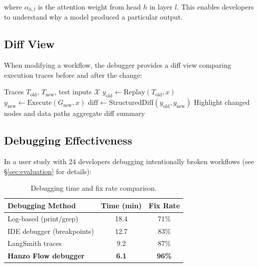 where $\alpha_{h,l}$ is the attention weight from head $h$ in layer $l$. This enables developers to understand why a model produced a particular output.

\subsection{Diff View}

When modifying a workflow, the debugger provides a diff view comparing execution traces before and after the change:

\begin{algorithm}[H]
\caption{Execution Diff Analysis}
\label{alg:diff}
\begin{algorithmic}[1]
\Require Traces $T_{\text{old}}$, $T_{\text{new}}$, test inputs $\mathcal{X}$
    \State $y_{\text{old}} \gets \text{Replay}(T_{\text{old}}, x)$
    \State $y_{\text{new}} \gets \text{Execute}(G_{\text{new}}, x)$
    \State $\text{diff} \gets \text{StructuredDiff}(y_{\text{old}}, y_{\text{new}})$
    \State Highlight changed nodes and data paths
\EndFor
\State \Return aggregate diff summary
\end{algorithmic}
\end{algorithm}

\subsection{Debugging Effectiveness}

In a user study with 24 developers debugging intentionally broken workflows (see \S\ref{sec:evaluation} for details):

\begin{table}[H]
\centering
\small
\begin{tabular}{lcc}
\toprule
\textbf{Debugging Method} & \textbf{Time (min)} & \textbf{Fix Rate} \\
\midrule
Log-based (print/grep) & 18.4 & 71\% \\
IDE debugger (breakpoints) & 12.7 & 83\% \\
LangSmith traces & 9.2 & 87\% \\
\textbf{Hanzo Flow debugger} & \textbf{6.1} & \textbf{96\%} \\
\bottomrule
\end{tabular}
\caption{Debugging time and fix rate comparison.}
\label{tab:debug}
\end{table}

